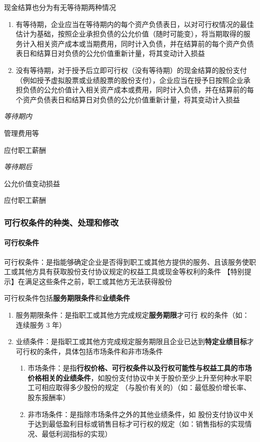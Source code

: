 \documentclass[UTF8,12pt]{ctexart}
\newenvironment{Dr}{%
	\begin{list}{}%
		{
			\setlength{\leftmargin}{2em}
			\setlength{\labelwidth}{2em}
			\setlength{\labelsep}{0pt}
			\setlength{\itemindent}{0pt}
			\setlength{\listparindent}{0pt}
			\setlength{\parsep}{0pt}
			\setlength{\topsep}{0pt}
		}
		\item[\textbf{借：}]
	}{%
	\end{list}
}
\newenvironment{Cr}{%
	\begin{list}{}%
		{
			\setlength{\leftmargin}{2em}
			\setlength{\labelwidth}{2em}
			\setlength{\labelsep}{0pt}
			\setlength{\itemindent}{0pt}
			\setlength{\listparindent}{0pt}
			\setlength{\parsep}{0pt}
			\setlength{\topsep}{0pt}
		}
		\item[\textbf{贷：}]
	}{%
	\end{list}
}
\numberwithin{equation}{section} %
\numberwithin{figure}{section}
\numberwithin{table}{section}
\begin{document}
	现金结算也分为有无等待期两种情况
	
	\begin{enumerate}
		\item 有等待期，企业应当在等待期内的每个资产负债表日，以对可行权情况的最佳估计为基础，按照企业承担负债的公允价值（随时可能变），将当期取得的服务计入相关资产成本或当期费用，同时计入负债，并在结算前的每个资产负债表日和结算日对负债的公允价值重新计量，将其变动计入损益
		
		\item 没有等待期，对于授予后立即可行权（没有等待期）的现金结算的股份支付（例如授予虚拟股票或业绩股票的股份支付），企业应当在授予日按照企业承担负债的公允价值计入相关资产成本或费用，同时计入负债，并在结算前的每个资产负债表日和结算日对负债的公允价值重新计量，将其变动计入损益
	\end{enumerate}
	
	\textit{等待期内}
	
	\begin{Dr}
		管理费用等
	\end{Dr}
	\begin{Cr}
		应付职工薪酬
	\end{Cr}
	
	\textit{等待期后}
	
	\begin{Dr}
		公允价值变动损益
	\end{Dr}
	\begin{Cr}
		应付职工薪酬
	\end{Cr}
	
	
	\subsubsection{可行权条件的种类、处理和修改}
	\paragraph{可行权条件}可行权条件：是指能够确定企业是否得到职工或其他方提供的服务、且该服务使职工或其他方具有获取股份支付协议规定的权益工具或现金等权利的条件
	【特别提示】在满足这些条件之前，职工或其他方无法获得股份
	
	可行权条件包括\textbf{服务期限条件}和\textbf{业绩条件}
	\begin{enumerate}
		\item 服务期限条件：是指职工或其他方完成规定\textbf{服务期限}才可行 权的条件（如：连续服务 3 年）
		
		\item 业绩条件：是指职工或其他方完成规定服务期限且企业已达到\textbf{特定业绩目标}才可行权的条件，具体包括市场条件和非市场条件
		\begin{enumerate}
			\item 市场条件：是指\textbf{行权价格、可行权条件以及行权可能性与权益工具的市场价格相关的业绩条件}，如股份支付协议中关于股价至少上升至何种水平职工可相应取得多少股份的规定
			（与股价有关的）（如：最低股价增长率、股东报酬率）
			
			\item 非市场条件：是指除市场条件之外的其他业绩条件，如 股份支付协议中关于达到最低盈利目标或销售目标才可行权的规定（如：销售指标的实现情况、最低利润指标的实现）
		\end{enumerate}
	\end{enumerate}
	
\end{document}
